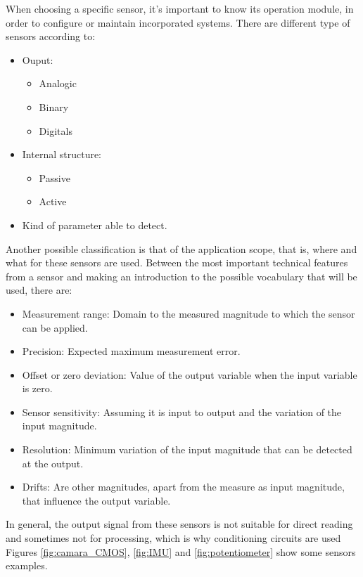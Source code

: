 When choosing a specific sensor, it’s important to know its operation module, in order to configure or maintain incorporated systems. There are different type of sensors according to:

\begin{itemize}
	\item Ouput: \begin{itemize}
		\item Analogic
		\item Binary
		\item Digitals
	\end{itemize} 
	
	\item Internal structure: \begin{itemize}
		\item Passive
		\item Active
	\end{itemize}
	
	\item Kind of parameter able to detect.
\end{itemize}
 

Another possible classification is that of the application scope, that is, where and what for these sensors are used. \newline
Between the most important technical features from a sensor and making an introduction to the possible vocabulary that will be used, there are:

\begin{itemize}
	\item Measurement range: Domain to the measured magnitude to which the sensor can be applied.
	\item Precision: Expected maximum measurement error.
	\item Offset or zero deviation: Value of the output variable when the input variable is zero.
	\item Sensor sensitivity: Assuming it is input to output and the variation of the input magnitude.
	\item Resolution: Minimum variation of the input magnitude that can be detected at the output.
	\item Drifts: Are other magnitudes, apart from the measure as input magnitude, that influence the output variable.
\end{itemize}

In general, the output signal from these sensors is not suitable for direct reading and sometimes not for processing, which is why conditioning circuits are used Figures \ref{fig:camara_CMOS}, \ref{fig:IMU} and \ref{fig:potentiometer} show some sensors examples.

